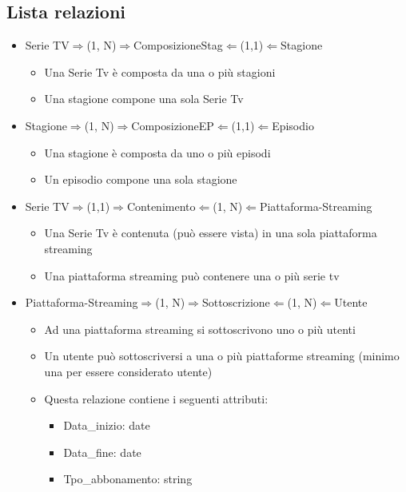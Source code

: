 \documentclass[12pt,a4paper]{article}
\begin{document}
\subsection{Lista relazioni}
\begin{itemize}
    \item Serie TV$\Rightarrow$(1, N)$\Rightarrow$ComposizioneStag$\Leftarrow$(1,1)$\Leftarrow$Stagione 
    \begin{itemize}
        \item Una Serie Tv è composta da una o più stagioni
        \item Una stagione compone una sola Serie Tv 
    \end{itemize}
    \item Stagione$\Rightarrow$(1, N)$\Rightarrow$ComposizioneEP$\Leftarrow$(1,1)$\Leftarrow$Episodio
    \begin{itemize}
        \item Una stagione è composta da uno o più episodi
        \item Un episodio compone una sola stagione
    \end{itemize}
    \item Serie TV$\Rightarrow$(1,1)$\Rightarrow$Contenimento$\Leftarrow$(1, N)$\Leftarrow$Piattaforma-Streaming
    \begin{itemize}
        \item Una Serie Tv è contenuta (può essere vista) in una sola piattaforma streaming
        \item Una piattaforma streaming può contenere una o più serie tv 
    \end{itemize}
    \item Piattaforma-Streaming$\Rightarrow$(1, N)$\Rightarrow$Sottoscrizione$\Leftarrow$(1, N)$\Leftarrow$Utente
    \begin{itemize}
        \item Ad una piattaforma streaming si sottoscrivono uno o più utenti
        \item Un utente può sottoscriversi a una o più piattaforme streaming (minimo una per essere considerato utente)
        \item Questa relazione contiene i seguenti attributi:
        \begin{itemize}
            \item Data\_inizio: date
            \item Data\_fine: date
            \item Tpo\_abbonamento: string
        \end{itemize}

\end{itemize}
\end{itemize}
\end{document}
